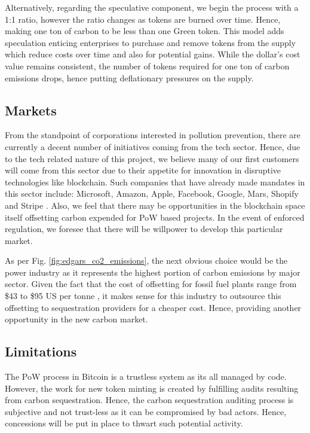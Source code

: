 \documentclass{article}
\begin{document}
Alternatively, regarding the speculative component, we begin the process with a 1:1 ratio, however the ratio changes as tokens are burned over time. Hence, making one ton of carbon to be less than one Green token. This model adds speculation enticing enterprises to purchase and remove tokens from the supply which reduce costs over time and also for potential gains. While the dollar's cost value remains consistent, the number of tokens required for one ton of carbon emissions drops, hence putting deflationary pressures on the supply.

\subsection{Markets}

From the standpoint of corporations interested in pollution prevention, there are currently a decent number of initiatives coming from the tech sector. Hence, due to the tech related nature of this project, we believe many of our first customers will come from this sector due to their appetite for innovation in disruptive technologies like blockchain. Such companies that have already made mandates in this sector include: Microsoft, Amazon, Apple, Facebook, Google, Mars, Shopify and Stripe \cite{Mic21}. Also, we feel that there may be opportunities in the blockchain space itself offsetting carbon expended for PoW based projects. In the event of enforced regulation, we foresee that there will be willpower  to develop this particular market. 

As per Fig. \ref{fig:edgars_co2_emissions}, the next obvious choice would be the power industry  \cite{Sch20,Gil18} as it represents the highest portion of carbon emissions by major sector. Given the fact that the cost of offsetting for fossil fuel plants range from \$43 to \$95 US per tonne \cite{Gil18}, it makes sense for this industry to outsource this offsetting to sequestration providers for a cheaper cost. Hence, providing another opportunity in the new carbon market.

\subsection{Limitations}

The PoW process in Bitcoin is a trustless system as its all managed by code. However, the work for new token minting is created by fulfilling audits resulting from carbon sequestration. Hence, the carbon sequestration auditing process is subjective and not trust-less as it can be compromised by bad actors. Hence, concessions will be put in place to thwart such potential activity.
\end{document}
